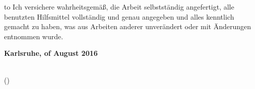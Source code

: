 
\thispagestyle{empty}
\null\vfill
\noindent\hbox to \textwidth{\hrulefill}
%
{Ich versichere wahrheitsgemäß, die Arbeit
selbstständig angefertigt, alle benutzten Hilfsmittel vollständig und genau
angegeben und alles kenntlich gemacht zu haben, was aus Arbeiten anderer
unverändert oder mit Änderungen entnommen wurde.}


\textbf{Karlsruhe,  of August 2016}
\vspace{1.5cm}

\dotfill\hspace*{8.0cm}\\
\hspace*{2cm}(\theauthor)
\cleardoublepage{}
